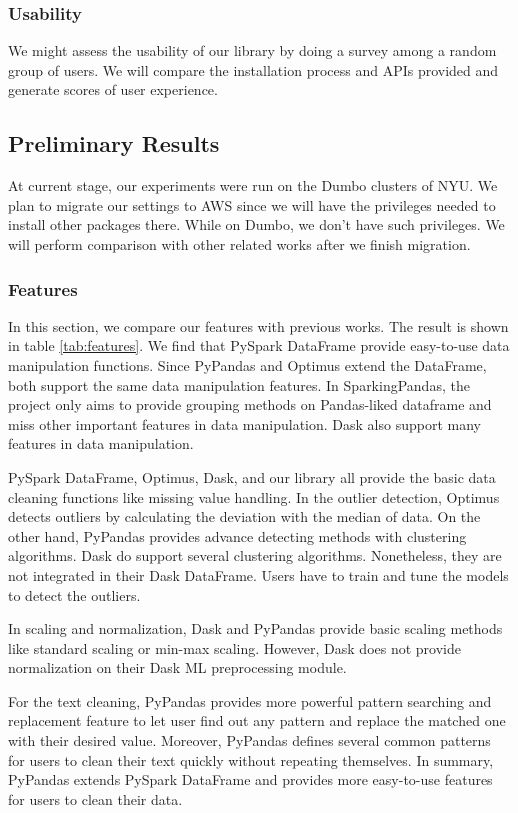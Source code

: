 \documentclass[sigconf]{acmart}
\begin{document}
\subsubsection{Usability}
We might assess the usability of our library by doing a survey among a random group of users. We will compare the installation process and APIs provided and generate scores of user experience.

\subsection{Preliminary Results}
At current stage, our experiments were run on the Dumbo clusters of NYU. We plan to migrate our settings to AWS since we will have the privileges needed to install other packages there. While on Dumbo, we don't have such privileges. We will perform comparison with other related works after we finish migration.

\subsubsection{Features}
In this section, we compare our features with previous works. The result is shown in table \ref{tab:features}. We find that PySpark DataFrame provide easy-to-use data manipulation functions. Since PyPandas and Optimus extend the DataFrame, both support the same data manipulation features. In SparkingPandas, the project only aims to provide grouping methods on Pandas-liked dataframe and miss other important features in data manipulation. Dask also support many features in data manipulation. 

PySpark DataFrame, Optimus, Dask, and our library all provide the basic data cleaning functions like missing value handling. In the outlier detection, Optimus detects outliers by calculating the deviation with the median of data. On the other hand, PyPandas provides advance detecting methods with clustering algorithms. Dask do support several clustering algorithms. Nonetheless, they are not integrated in their Dask DataFrame. Users have to train and tune the models to detect the outliers.

In scaling and normalization, Dask and PyPandas provide basic scaling methods like standard scaling or min-max scaling. However, Dask does not provide normalization on their Dask ML preprocessing module.

For the text cleaning, PyPandas provides more powerful pattern searching and replacement feature to let user find out any pattern and replace the matched one with their desired value. Moreover, PyPandas defines several common patterns for users to clean their text quickly without repeating themselves. In summary, PyPandas extends PySpark DataFrame and provides more easy-to-use features for users to clean their data.
\end{document}
